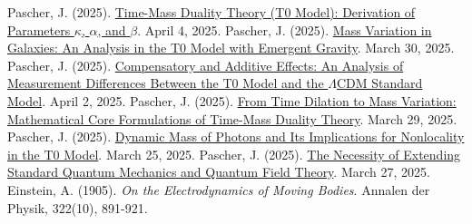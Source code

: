 \documentclass[a4paper,12pt]{article}
\begin{document}
	\begin{thebibliography}{99}
		 Pascher, J. (2025). \href{https://github.com/jpascher/T0-Time-Mass-Duality/tree/main/2/pdf/English/ZeitMasseT0ParamsEn.pdf}{Time-Mass Duality Theory (T0 Model): Derivation of Parameters \(\kappa\), \(\alpha\), and \(\beta\)}. April 4, 2025.
		 Pascher, J. (2025). \href{https://github.com/jpascher/T0-Time-Mass-Duality/tree/main/2/pdf/English/MassVarGalaxienEn.pdf}{Mass Variation in Galaxies: An Analysis in the T0 Model with Emergent Gravity}. March 30, 2025.
		 Pascher, J. (2025). \href{https://github.com/jpascher/T0-Time-Mass-Duality/tree/main/2/pdf/English/MessdifferenzenT0StandardEn.pdf}{Compensatory and Additive Effects: An Analysis of Measurement Differences Between the T0 Model and the \(\Lambda\)CDM Standard Model}. April 2, 2025.
		 Pascher, J. (2025). \href{https://github.com/jpascher/T0-Time-Mass-Duality/tree/main/2/pdf/English/MathZeitMasseLagrange.pdf}{From Time Dilation to Mass Variation: Mathematical Core Formulations of Time-Mass Duality Theory}. March 29, 2025.
		 Pascher, J. (2025). \href{https://github.com/jpascher/T0-Time-Mass-Duality/tree/main/2/pdf/English/DynMassePhotonenNichtlokalEn.pdf}{Dynamic Mass of Photons and Its Implications for Nonlocality in the T0 Model}. March 25, 2025.
		 Pascher, J. (2025). \href{https://github.com/jpascher/T0-Time-Mass-Duality/tree/main/2/pdf/English/NotwendigkeitQMErweiterungEn.pdf}{The Necessity of Extending Standard Quantum Mechanics and Quantum Field Theory}. March 27, 2025.
		 Einstein, A. (1905). \textit{On the Electrodynamics of Moving Bodies}. Annalen der Physik, 322(10), 891-921.
	\end{thebibliography}
	
\end{document}

